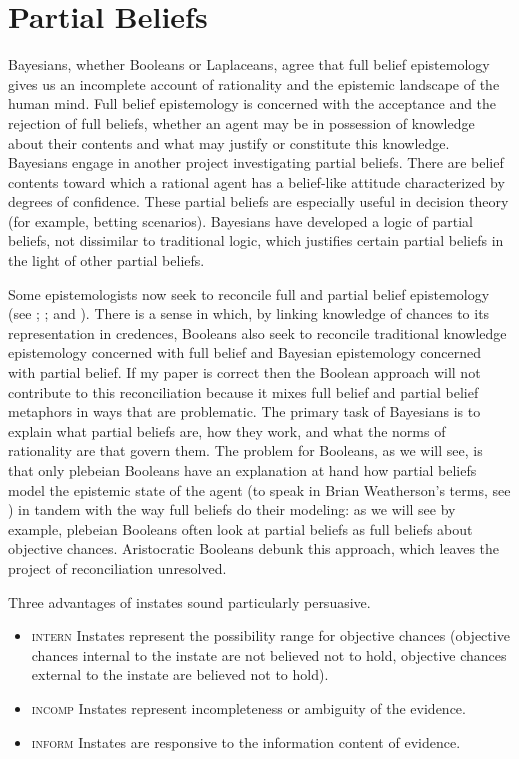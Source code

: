\documentclass[12pt]{article}
\begin{document}
\section{Partial Beliefs}
\label{amalgamated}

Bayesians, whether Booleans or Laplaceans, agree that full belief
epistemology gives us an incomplete account of rationality and the
epistemic landscape of the human mind. Full belief epistemology is
concerned with the acceptance and the rejection of full beliefs,
whether an agent may be in possession of knowledge about their
contents and what may justify or constitute this knowledge. Bayesians
engage in another project investigating partial beliefs. There are
belief contents toward which a rational agent has a belief-like
attitude characterized by degrees of confidence. These partial beliefs
are especially useful in decision theory (for example, betting
scenarios). Bayesians have developed a logic of partial beliefs, not
dissimilar to traditional logic, which justifies certain partial
beliefs in the light of other partial beliefs.

Some epistemologists now seek to reconcile full and partial belief
epistemology (see ; ; and
). There is a sense in which, by linking knowledge
of chances to its representation in credences, Booleans also seek to
reconcile traditional knowledge epistemology concerned with full
belief and Bayesian epistemology concerned with partial belief. If my
paper is correct then the Boolean approach will not contribute to this
reconciliation because it mixes full belief and partial belief
metaphors in ways that are problematic. The
primary task of Bayesians is to explain what partial beliefs are, how
they work, and what the norms of rationality are that govern them. The
problem for Booleans, as we will see, is that only plebeian Booleans
have an explanation at hand how partial beliefs model the epistemic
state of the agent (to speak in Brian Weatherson's terms, see
) in tandem with the way full beliefs do
their modeling: as we will see by example, plebeian Booleans often
look at partial beliefs as full beliefs about objective chances.
Aristocratic Booleans debunk this approach, which leaves the project
of reconciliation unresolved.

Three advantages of instates sound particularly persuasive.

\begin{itemize}
\item \textsc{intern} Instates represent the possibility range for
  objective chances (objective chances internal to the instate are not
  believed not to hold, objective chances external to the instate are
  believed not to hold).
\item \textsc{incomp} Instates represent incompleteness or
  ambiguity of the evidence.
\item \textsc{inform} Instates are responsive to the information
  content of evidence.
\end{itemize}
\end{document}
